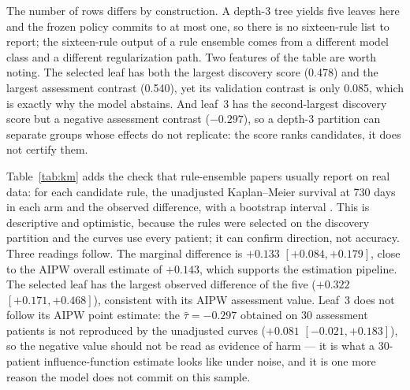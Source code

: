 \documentclass[conference]{IEEEtran}
\begin{document}
The number of rows differs by construction. A depth-3 tree yields five leaves
here and the frozen policy commits to at most one, so there is no sixteen-rule
list to report; the sixteen-rule output of a rule ensemble comes from a
different model class and a different regularization path. Two features of the
table are worth noting. The selected leaf has both the largest discovery score
(0.478) and the largest assessment contrast (0.540), yet its validation
contrast is only 0.085, which is exactly why the model abstains. And leaf~3 has
the second-largest discovery score but a negative assessment contrast
($-0.297$), so a depth-3 partition can separate groups whose effects do not
replicate: the score ranks candidates, it does not certify them.

Table~\ref{tab:km} adds the check that rule-ensemble papers usually report on
real data: for each candidate rule, the unadjusted Kaplan--Meier survival at 730
days in each arm and the observed difference, with a bootstrap interval
\cite{scre}. This is descriptive and optimistic, because the rules were
selected on the discovery partition and the curves use every patient; it can
confirm direction, not accuracy. Three readings follow. The marginal difference
is $+0.133$ $[+0.084,+0.179]$, close to the AIPW overall estimate of $+0.143$,
which supports the estimation pipeline. The selected leaf has the largest
observed difference of the five ($+0.322$ $[+0.171,+0.468]$), consistent with
its AIPW assessment value. Leaf~3 does not follow its AIPW point estimate: the
$\hat\tau=-0.297$ obtained on 30 assessment patients is not reproduced by the
unadjusted curves ($+0.081$ $[-0.021,+0.183]$), so the negative value should not
be read as evidence of harm — it is what a 30-patient influence-function
estimate looks like under noise, and it is one more reason the model does not
commit on this sample.
\end{document}
